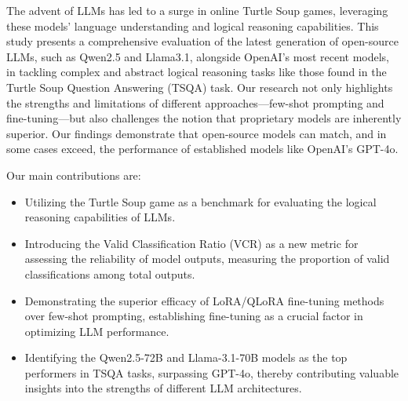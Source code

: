 \documentclass[conference]{IEEEtran}
\begin{document}
The advent of LLMs has led to a surge in online Turtle Soup games, leveraging these models' language understanding and logical reasoning capabilities. %
This study presents a comprehensive evaluation of the latest generation of open-source LLMs, such as Qwen2.5 and Llama3.1, alongside OpenAI's most recent models, in tackling complex and abstract logical reasoning tasks like those found in the Turtle Soup Question Answering (TSQA) task. Our research not only highlights the strengths and limitations of different approaches—few-shot prompting and fine-tuning—but also challenges the notion that proprietary models are inherently superior. Our findings demonstrate that open-source models can match, and in some cases exceed, the performance of established models like OpenAI's GPT-4o.

Our main contributions are:
\begin{itemize}
    \item Utilizing the Turtle Soup game as a benchmark for evaluating the logical reasoning capabilities of LLMs.
    
    \item Introducing the Valid Classification Ratio (VCR) as a new metric for assessing the reliability of model outputs, measuring the proportion of valid classifications among total outputs.

    \item Demonstrating the superior efficacy of LoRA/QLoRA fine-tuning methods over few-shot prompting, establishing fine-tuning as a crucial factor in optimizing LLM performance.

    \item Identifying the Qwen2.5-72B and Llama-3.1-70B models as the top performers in TSQA tasks, surpassing GPT-4o, thereby contributing valuable insights into the strengths of different LLM architectures.
\end{itemize}


\end{document}
